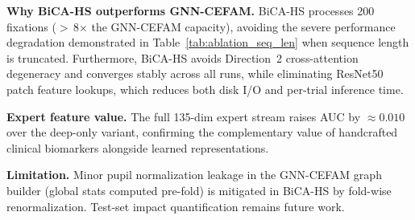 \textbf{Why BiCA-HS outperforms GNN-CEFAM.} BiCA-HS processes 200 fixations ($>$\,8$\times$ the GNN-CEFAM capacity), avoiding the severe performance degradation demonstrated in Table~\ref{tab:ablation_seq_len} when sequence length is truncated. Furthermore, BiCA-HS avoids Direction~2 cross-attention degeneracy and converges stably across all runs, while eliminating ResNet50 patch feature lookups, which reduces both disk I/O and per-trial inference time.

\textbf{Expert feature value.} The full 135-dim expert stream raises AUC by ${\approx}0.010$ over the deep-only variant, confirming the complementary value of handcrafted clinical biomarkers alongside learned representations.

\textbf{Limitation.} Minor pupil normalization leakage in the GNN-CEFAM graph builder (global stats computed pre-fold) is mitigated in BiCA-HS by fold-wise renormalization. Test-set impact quantification remains future work.
